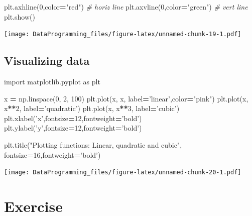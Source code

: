 \documentclass[]{book}
\newenvironment{Shaded}{\begin{snugshade}}{\end{snugshade}}
\newcommand{\CommentTok}[1]{\textcolor[rgb]{0.56,0.35,0.01}{\textit{#1}}}
\newcommand{\DecValTok}[1]{\textcolor[rgb]{0.00,0.00,0.81}{#1}}
\newcommand{\ImportTok}[1]{#1}
\newcommand{\NormalTok}[1]{#1}
\newcommand{\OperatorTok}[1]{\textcolor[rgb]{0.81,0.36,0.00}{\textbf{#1}}}
\newcommand{\StringTok}[1]{\textcolor[rgb]{0.31,0.60,0.02}{#1}}
\begin{document}
\begin{Shaded}
\begin{Highlighting}[]
\NormalTok{plt.axhline(}\DecValTok{0}\NormalTok{,color}\OperatorTok{=}\StringTok{"red"}\NormalTok{) }\CommentTok{# horiz line}
\NormalTok{plt.axvline(}\DecValTok{0}\NormalTok{,color}\OperatorTok{=}\StringTok{"green"}\NormalTok{) }\CommentTok{# vert line}
\NormalTok{plt.show()}
\end{Highlighting}
\end{Shaded}

\texttt{[image: DataProgramming\_files/figure-latex/unnamed-chunk-19-1.pdf]}

\hypertarget{visualizing-data}{%
\subsection{Visualizing data}\label{visualizing-data}}

\begin{Shaded}
\begin{Highlighting}[]

\ImportTok{import}\NormalTok{ matplotlib.pyplot }\ImportTok{as}\NormalTok{ plt}

\NormalTok{x }\OperatorTok{=}\NormalTok{ np.linspace(}\DecValTok{0}\NormalTok{, }\DecValTok{2}\NormalTok{, }\DecValTok{100}\NormalTok{)}
\NormalTok{plt.plot(x, x, label}\OperatorTok{=}\StringTok{'linear'}\NormalTok{,color}\OperatorTok{=}\StringTok{"pink"}\NormalTok{)}
\NormalTok{plt.plot(x, x}\OperatorTok{**}\DecValTok{2}\NormalTok{, label}\OperatorTok{=}\StringTok{'quadratic'}\NormalTok{)}
\NormalTok{plt.plot(x, x}\OperatorTok{**}\DecValTok{3}\NormalTok{, label}\OperatorTok{=}\StringTok{'cubic'}\NormalTok{)}
\NormalTok{plt.xlabel(}\StringTok{'x'}\NormalTok{,fontsize}\OperatorTok{=}\DecValTok{12}\NormalTok{,fontweight}\OperatorTok{=}\StringTok{'bold'}\NormalTok{)}
\NormalTok{plt.ylabel(}\StringTok{'y'}\NormalTok{,fontsize}\OperatorTok{=}\DecValTok{12}\NormalTok{,fontweight}\OperatorTok{=}\StringTok{'bold'}\NormalTok{)}

\NormalTok{plt.title(}\StringTok{"Plotting functions: Linear, quadratic and cubic"}\NormalTok{, fontsize}\OperatorTok{=}\DecValTok{16}\NormalTok{,fontweight}\OperatorTok{=}\StringTok{'bold'}\NormalTok{)}
\end{Highlighting}
\end{Shaded}

\texttt{[image: DataProgramming\_files/figure-latex/unnamed-chunk-20-1.pdf]}

\hypertarget{exercise-1}{%
\section{Exercise}\label{exercise-1}}
\end{document}
